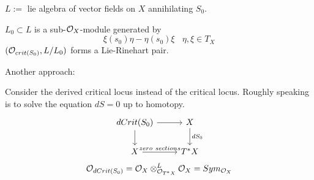 \documentclass[11pt]{article}
\newcommand{\calo}{{\cal O}}
\begin{document}
$L:=$ lie algebra of vector fields on $X$ annihilating $S_0$.

$L_0\subset L$ is a sub-$\calo_X$-module generated by
$$
\xi(s_0)\eta-\eta(s_0)\xi\ \ \ \ \eta, \xi \in T_X
$$
$(\calo_{crit(S_0)}, L/L_0)$ forms a Lie-Rinehart pair.

Another approach:

Consider the derived critical locus instead of the critical locus. Roughly speaking is to solve the equation $dS=0$ up to homotopy.
$$
\begin{tikzcd}
dCrit(S_0) \arrow[d] \arrow[r] & X \arrow[d, "dS_0"] \\
X \arrow[r, "zero\ sections"] & T^*X
\end{tikzcd}
$$
$$
\calo_{dCrit(S_0)}=\calo_X\otimes^{L}_{\calo_{T^*X}}\calo_{X}=Sym_{\calo_X}
$$
\end{document}
